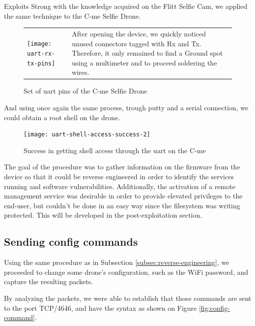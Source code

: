 \begin{chaptercover}{Exploits}
Strong with the knowledge acquired on the Flitt Selfie Cam, we applied the same technique to the C-me Selfie Drone.

\begin{figure}[H]
\begin{center}
\begin{tabular}{m{9cm}m{8.3cm}}
  \texttt{[image: uart-rx-tx-pins]}
  \caption{Set of \acrshort{uart} pins of the C-me Selfie Drone}
  & After opening the device, we quickly noticed unused connectors tagged with Rx and Tx. Therefore, it only remained to find a Ground spot using a multimeter and to proceed soldering the wires. \\
\end{tabular}
\end{center}
\end{figure}

\vspace{-1cm}
And using once again the same process, trough putty and a serial connection, we could obtain a root shell on the drone.

\begin{figure}[H]
  \centering
  \texttt{[image: uart-shell-access-success-2]}
  \caption{Success in getting shell access through the \acrshort{uart} on the C-me}
  \label{fig:uart-shell-access-success-2}
\end{figure}

The goal of the procedure was to gather information on the firmware from the device so that it could be reverse engineered in order to identify the services running and software vulnerabilities. Additionally, the activation of a remote management service was desirable in order to provide elevated privileges to the end-user, but couldn’t be done in an easy way since the filesystem was writing protected. This will be developed in the post-exploitation section.

\subsection{Sending config commands}\label{subsec:sending-config-commands}

Using the same procedure as in Subsection \ref{subsec:reverse-engineering}, we proceeded to change some drone's configuration, such as the WiFi password, and capture the resulting packets.

By analyzing the packets, we were able to establish that those commands are sent to the port TCP/4646, and have the syntax as shown on Figure \ref{fig:config-command}.


\end{chaptercover}
